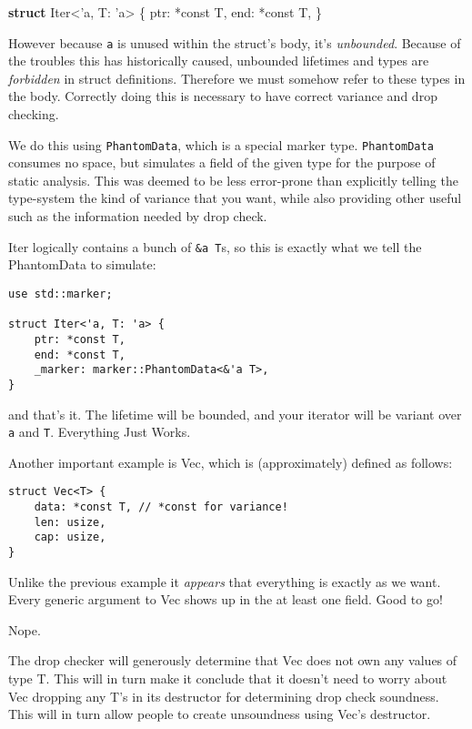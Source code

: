\documentclass[a4paper,]{book}
\newenvironment{Shaded}{\begin{snugshade}}{\end{snugshade}}
\newcommand{\KeywordTok}[1]{\textcolor[rgb]{0.13,0.29,0.53}{\textbf{{#1}}}}
\newcommand{\OtherTok}[1]{\textcolor[rgb]{0.56,0.35,0.01}{{#1}}}
\newcommand{\NormalTok}[1]{{#1}}
\begin{document}
\begin{Shaded}
\begin{Highlighting}[]
\KeywordTok{struct} \NormalTok{Iter<}\OtherTok{'a}\NormalTok{, T: }\OtherTok{'a}\NormalTok{> \{}
    \NormalTok{ptr: *const T,}
    \NormalTok{end: *const T,}
\NormalTok{\}}
\end{Highlighting}
\end{Shaded}

However because \texttt{\textquotesingle{}a} is unused within the
struct's body, it's \emph{unbounded}. Because of the troubles this has
historically caused, unbounded lifetimes and types are \emph{forbidden}
in struct definitions. Therefore we must somehow refer to these types in
the body. Correctly doing this is necessary to have correct variance and
drop checking.

We do this using \texttt{PhantomData}, which is a special marker type.
\texttt{PhantomData} consumes no space, but simulates a field of the
given type for the purpose of static analysis. This was deemed to be
less error-prone than explicitly telling the type-system the kind of
variance that you want, while also providing other useful such as the
information needed by drop check.

Iter logically contains a bunch of \texttt{\&\textquotesingle{}a\ T}s,
so this is exactly what we tell the PhantomData to simulate:

\begin{verbatim}
use std::marker;

struct Iter<'a, T: 'a> {
    ptr: *const T,
    end: *const T,
    _marker: marker::PhantomData<&'a T>,
}
\end{verbatim}

and that's it. The lifetime will be bounded, and your iterator will be
variant over \texttt{\textquotesingle{}a} and \texttt{T}. Everything
Just Works.

Another important example is Vec, which is (approximately) defined as
follows:

\begin{verbatim}
struct Vec<T> {
    data: *const T, // *const for variance!
    len: usize,
    cap: usize,
}
\end{verbatim}

Unlike the previous example it \emph{appears} that everything is exactly
as we want. Every generic argument to Vec shows up in the at least one
field. Good to go!

Nope.

The drop checker will generously determine that Vec does not own any
values of type T. This will in turn make it conclude that it doesn't
need to worry about Vec dropping any T's in its destructor for
determining drop check soundness. This will in turn allow people to
create unsoundness using Vec's destructor.
\end{document}
